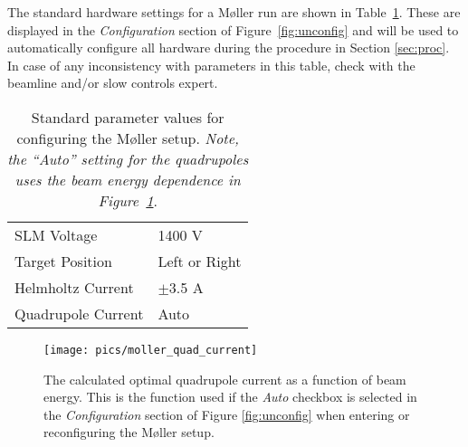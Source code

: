 \documentclass[amsmath,amssymb,notitlepage,12pt]{revtex4}
\begin{document}
The standard hardware settings for a M{\o}ller run are shown in Table~\ref{tab:pars}.  These are displayed in the {\em Configuration} section of Figure~\ref{fig:unconfig} and will be used to automatically configure all hardware during the procedure in Section \ref{sec:proc}.  In case of any inconsistency with parameters in this table, check with the beamline and/or slow controls expert.

\begin{table}[htbp]\centering
    \begin{tabular}{ll}\toprule[1.5pt]
        SLM Voltage & 1400 V \\
        Target Position & Left or Right \\
        Helmholtz Current & $\pm$3.5 A \\
        Quadrupole Current & Auto \\
        \bottomrule[1.5pt]
    \end{tabular}
    \caption{Standard parameter values for configuring the M{\o}ller setup. {\em  Note, the ``Auto'' setting for the quadrupoles uses the beam energy dependence in Figure~\ref{fig:quadenergy}}.\label{tab:pars}}
\end{table}

\begin{figure}[htbp]\centering
    \texttt{[image: pics/moller\_quad\_current]}
    \caption{The calculated optimal quadrupole current as a function of beam energy.  This is the function used if the {\em Auto} checkbox is selected in the {\em Configuration} section of Figure \ref{fig:unconfig} when entering or reconfiguring the M{\o}ller setup.\label{fig:quadenergy}}
\end{figure}
\end{document}
